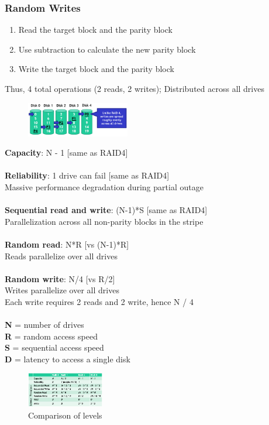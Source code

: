 \documentclass[10pt, oneside]{article}
\begin{document}
\subsubsection*{Random Writes}
\begin{enumerate}
    \item Read the target block and the parity block
    \item Use subtraction to calculate the new parity block
    \item Write the target block and the parity block
\end{enumerate}
Thus, 4 total operations (2 reads, 2 writes); Distributed across all drives
\begin{figure}[H]
    \begin{center}
    \includegraphics[width=0.4\textwidth]{img/img79.png}
    \end{center}
\end{figure}{\bf Capacity}: N - 1 [same as RAID4]\\\\
{\bf Reliability}: 1 drive can fail [same as RAID4]\\  Massive performance degradation during partial outage\\\\
{\bf Sequential read and write}: (N-1)*S [same as RAID4]\\  Parallelization across all non-parity blocks in the stripe\\\\
{\bf Random read}: N*R [vs (N-1)*R]\\  Reads parallelize over all drives\\\\
{\bf Random write}: N/4 [vs R/2]\\  Writes parallelize over all drives\\ Each write requires 2 reads and 2 write, hence N / 4\\\\
{\bf N} = number of drives\\
{\bf R} = random access speed\\
{\bf S} = sequential access speed\\
{\bf D} = latency to access a single disk
\begin{figure}[H]
    \begin{center}
    \includegraphics[width=0.3\textwidth]{img/img80.png}
    \caption{Comparison of levels}
    \end{center}
\end{figure}
\end{document}
